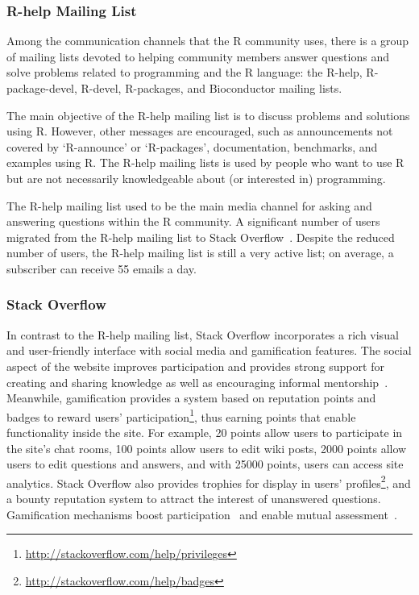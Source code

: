\documentclass{sig-alternate-05-2015}
\begin{document}
\subsubsection{R-help Mailing List}

	Among the communication channels that the R community uses, there is a group of mailing lists devoted to helping community members answer questions and solve problems related to programming and the R language: the R-help, R-package-devel, R-devel, R-packages, and Bioconductor mailing lists.

	The main objective of the R-help mailing list is to discuss problems and solutions using R. 
	However, other messages are encouraged, such as announcements not covered by `R-announce' or `R-packages', documentation, benchmarks, and examples using R.
	The R-help mailing lists is used by people who want to use R but are not necessarily knowledgeable about (or interested in) programming.

	The R-help mailing list used to be the main media channel for asking and answering questions within the R community.
    A significant number of users migrated from the R-help mailing list to Stack Overflow~\cite{Vasilescu2014c}.
	Despite the reduced number of users, the R-help mailing list is still a very active list; on average, a subscriber can receive 55 emails a day.

\subsubsection{Stack Overflow}
\label{subsec:Rtag}

	In contrast to the R-help mailing list, Stack Overflow incorporates a rich visual and user-friendly interface with social media and gamification features.
	The social aspect of the website improves participation and provides strong support for creating and sharing knowledge as well as encouraging informal mentorship~\cite{Jenkins2009, Storey2014}.
	Meanwhile, gamification provides a system based on reputation points and badges to reward users' participation\footnote{\url{http://stackoverflow.com/help/privileges}}, thus earning points that enable functionality inside the site.
	For example, 20 points allow users to participate in the site's chat rooms, 100 points allow users to edit wiki posts, 2000 points allow users to edit questions and answers, and with 25000 points, users can access site analytics.
	Stack Overflow also provides trophies for display in users' profiles\footnote{\url{http://stackoverflow.com/help/badges}}, and a bounty reputation system to attract the interest of unanswered questions.
	Gamification mechanisms boost participation~\cite{Vasilescu2014} and enable mutual assessment~\cite{Singer2013}.
\end{document}
